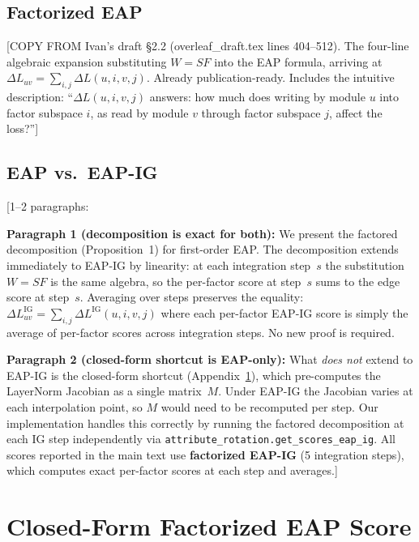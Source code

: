\documentclass[11pt]{article}
\begin{document}
\subsection{Factorized EAP}

[COPY FROM Ivan's draft \S2.2 (overleaf\_draft.tex lines 404--512).
The four-line algebraic expansion substituting $W = SF$ into the EAP
formula, arriving at $\Delta L_{uv} = \sum_{i,j} \Delta L(u,i,v,j)$.
Already publication-ready. Includes the intuitive description:
``$\Delta L(u,i,v,j)$ answers: how much does writing by module $u$ into
factor subspace $i$, as read by module $v$ through factor subspace $j$,
affect the loss?'']

\subsection{EAP vs.\ EAP-IG}

[1--2 paragraphs:

\textbf{Paragraph 1 (decomposition is exact for both):}
We present the factored decomposition (Proposition~1) for first-order
EAP.  The decomposition extends immediately to EAP-IG by linearity: at
each integration step~$s$ the substitution $W = SF$ is the same
algebra, so the per-factor score at step~$s$ sums to the edge score at
step~$s$.  Averaging over steps preserves the equality:
$\Delta L_{uv}^{\mathrm{IG}} = \sum_{i,j} \Delta L^{\mathrm{IG}}(u,i,v,j)$
where each per-factor EAP-IG score is simply the average of per-factor
scores across integration steps.  No new proof is required.

\textbf{Paragraph 2 (closed-form shortcut is EAP-only):}
What \emph{does not} extend to EAP-IG is the closed-form shortcut
(Appendix~\ref{app:closed_form}), which pre-computes the LayerNorm
Jacobian as a single matrix~$M$.  Under EAP-IG the Jacobian varies at
each interpolation point, so $M$ would need to be recomputed per step.
Our implementation handles this correctly by running the factored
decomposition at each IG step independently via
\texttt{attribute\_rotation.get\_scores\_eap\_ig}.  All scores reported
in the main text use \textbf{factorized EAP-IG} (5 integration steps),
which computes exact per-factor scores at each step and averages.]



\section{Closed-Form Factorized EAP Score}
\label{app:closed_form}
\end{document}
